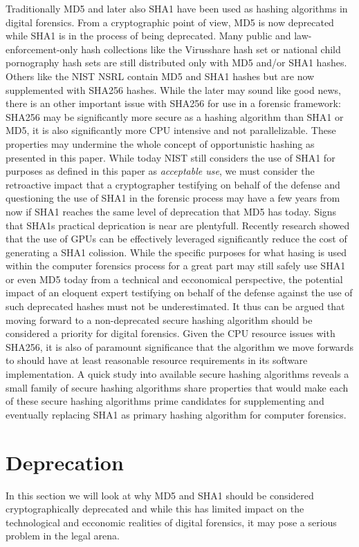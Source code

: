 Traditionally MD5 and later also SHA1 have been used as hashing algorithms in digital forensics. From a cryptographic point of view, MD5 is now deprecated while SHA1 is in the process of being deprecated. Many public and law-enforcement-only hash collections like the Virusshare hash set or national child pornography hash sets are still distributed only with MD5 and/or SHA1 hashes. Others like the NIST NSRL contain MD5 and SHA1 hashes but are now supplemented with SHA256 hashes. While the later may sound like good news, there is an other important issue with SHA256 for use in a forensic framework: SHA256 may be significantly more secure as a hashing algorithm than SHA1 or MD5, it is also significantly more CPU intensive and not parallelizable. These properties may undermine the whole concept of opportunistic hashing as presented in this paper. While today NIST still considers the use of SHA1 for purposes as defined in this paper as \emph{acceptable use}, we must consider the retroactive impact that a cryptographer testifying on behalf of the defense and questioning the use of SHA1 in the forensic process may have a few years from now if SHA1 reaches the same level of deprecation that MD5 has today. Signs that SHA1s practical deprication is near are plentyfull. Recently research showed that the use of GPUs can be effectively leveraged significantly reduce the cost of generating a SHA1 colission. While the specific purposes for what hasing is used within the computer forensics process for a great part may still safely use SHA1 or even MD5 today from a technical and ecconomical perspective, the potential impact of an eloquent expert testifying on behalf of the defense against the use of such deprecated hashes must not be underestimated. It thus can be argued that moving forward to a non-deprecated secure hashing algorithm should be considered a priority for digital forensics.  Given the CPU resource issues with SHA256, it is also of paramount significance that the algorithm we move forwards to should have at least reasonable resource requirements in its software implementation. A quick study into available secure hashing algorithms reveals a small family of secure hashing algorithms share properties that would make each of these secure hashing algorithms prime candidates for supplementing and eventually replacing SHA1 as primary hashing algorithm for computer forensics.

\section{Deprecation}
In this section we will look at why MD5 and SHA1 should be considered cryptographically deprecated and while this has limited impact on the technological and ecconomic realities of digital forensics, it may pose a serious problem in the legal arena.

